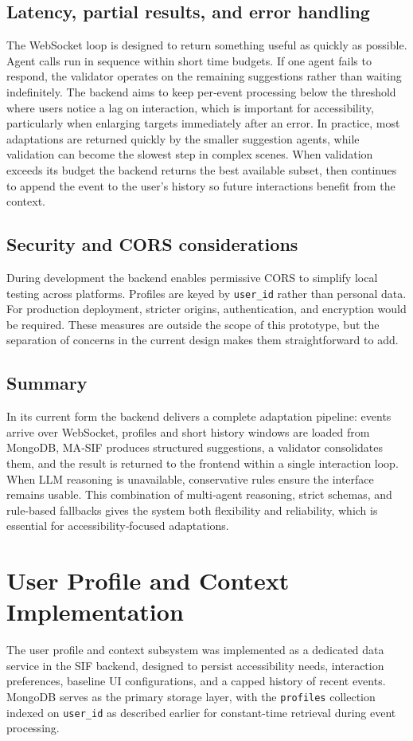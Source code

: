 \documentclass[openany]{book}
\begin{document}
\subsection{Latency, partial results, and error handling}
The WebSocket loop is designed to return something useful as quickly as possible. Agent calls run in sequence within short time budgets. If one agent fails to respond, the validator operates on the remaining suggestions rather than waiting indefinitely. The backend aims to keep per‑event processing below the threshold where users notice a lag on interaction, which is important for accessibility, particularly when enlarging targets immediately after an error. In practice, most adaptations are returned quickly by the smaller suggestion agents, while validation can become the slowest step in complex scenes. When validation exceeds its budget the backend returns the best available subset, then continues to append the event to the user’s history so future interactions benefit from the context.

\subsection{Security and CORS considerations}
During development the backend enables permissive CORS to simplify local testing across platforms. Profiles are keyed by \texttt{user\_id} rather than personal data. For production deployment, stricter origins, authentication, and encryption would be required. These measures are outside the scope of this prototype, but the separation of concerns in the current design makes them straightforward to add.

\subsection{Summary}
In its current form the backend delivers a complete adaptation pipeline: events arrive over WebSocket, profiles and short history windows are loaded from MongoDB, MA‑SIF produces structured suggestions, a validator consolidates them, and the result is returned to the frontend within a single interaction loop. When LLM reasoning is unavailable, conservative rules ensure the interface remains usable. This combination of multi‑agent reasoning, strict schemas, and rule-based fallbacks gives the system both flexibility and reliability, which is essential for accessibility‑focused adaptations.

\section{User Profile and Context Implementation}
The user profile and context subsystem was implemented as a dedicated data service in the SIF backend, designed to persist accessibility needs, interaction preferences, baseline UI configurations, and a capped history of recent events. MongoDB serves as the primary storage layer, with the \texttt{profiles} collection indexed on \texttt{user\_id} as described earlier for constant-time retrieval during event processing.
\end{document}
